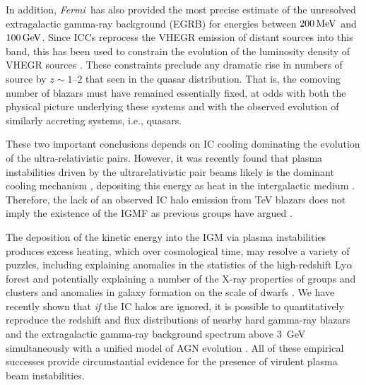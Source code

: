 \documentclass[usenatbib,iop,apj]{emulateapj}
\newcommand\qc[1]{{\color{red} \bf #1}}
\def\eV{{\rm eV}} %
\def\MeV{{\rm M}\eV} %
\def\GeV{{\rm G}\eV} %
\def\Fermi{{\em Fermi\ }}
\begin{document}
In addition, \Fermi has also provided the most precise estimate of the unresolved
extragalactic gamma-ray background (EGRB) for energies between
$200\,\MeV$ and $100\,\GeV$.  Since ICCs reprocess the VHEGR emission of
distant sources into this band, this has been used to constrain the
evolution of the luminosity density of VHEGR sources
\citep[see, e.g., ][]{Naru-Tota:06,Knei-Mann:08,Inou-Tota:09,Vent:10}.
These constraints preclude any dramatic rise in numbers of source by $z\sim1$--$2$ that seen in the quasar
distribution.  That is, the comoving number of blazars must have
remained essentially fixed, at odds with both the physical picture
underlying these systems and with the observed evolution of similarly
accreting systems, i.e., quasars.

These two important conclusions depends on IC cooling dominating the evolution of the ultra-relativistic pairs.  However, it was recently found that plasma instabilities driven by the
ultrarelativistic pair beams  likely is the dominant cooling mechanism
\citep{paperI,Schlickeiser+12,Schlickeiser+13}, depositing this energy
as heat in the intergalactic medium \citep{paperII,paperIII}.  Therefore, the lack of an observed
 IC halo emission from TeV blazars does not imply the existence of the IGMF as previous groups have argued
\citep{paperI,Schlickeiser+12,Schlickeiser+13}.


The deposition of the kinetic energy into the IGM via plasma instabilities produces excess heating, which over cosmological time, may resolve a variety
of puzzles, including explaining
anomalies in the statistics of the high-redshift Ly$\alpha$ forest
\citep{paperIV} and potentially explaining a number of the X-ray
properties of groups and clusters and anomalies in galaxy formation on
the scale of dwarfs \citep{paperIII,Lu+2013}.  We
have recently shown that \textit{if} the IC halos are ignored, it is possible
to quantitatively reproduce the redshift and flux distributions
of nearby hard gamma-ray blazars and the extragalactic gamma-ray background
spectrum above 3~GeV simultaneously with a unified model of AGN evolution
\citep{Broderick+2013,Broderick+2013b}.  All of these empirical successes provide
circumstantial evidence for the presence of virulent plasma beam
instabilities. 
\end{document}
